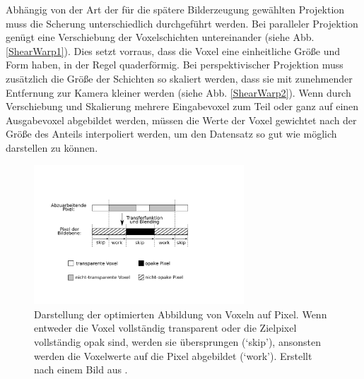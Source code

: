 \documentclass[a4paper,fontsize=12pt,toc=bib,halfparskip]{scrartcl}
\begin{document}
Abh\"angig von der Art der f\"ur die sp\"atere Bilderzeugung gew\"ahlten Projektion muss die Scherung unterschiedlich durchgef\"uhrt werden. Bei paralleler Projektion gen\"ugt eine Verschiebung der Voxelschichten untereinander (siehe Abb. \ref{ShearWarp1}). Dies setzt vorraus, dass die Voxel eine einheitliche Gr\"o{\ss}e und Form haben, in der Regel quaderf\"ormig. Bei perspektivischer Projektion muss zus\"atzlich die Gr\"o{\ss}e der Schichten so skaliert werden, dass sie mit zunehmender Entfernung zur Kamera kleiner werden (siehe Abb. \ref{ShearWarp2}). Wenn durch Verschiebung und Skalierung mehrere Eingabevoxel zum Teil oder ganz auf einen Ausgabevoxel abgebildet werden, m\"ussen die Werte der Voxel gewichtet nach der Gr\"o{\ss}e des Anteils interpoliert werden, um den Datensatz so gut wie m\"oglich darstellen zu k\"onnen.

\begin{figure}
	\centering
	\includegraphics[width=0.7\textwidth]{pictures/Scanline.png}
	\caption{Darstellung der optimierten Abbildung von Voxeln auf Pixel. Wenn entweder die Voxel vollst\"andig transparent oder die Zielpixel vollst\"andig opak sind, werden sie \"ubersprungen (`skip'), ansonsten werden die Voxelwerte auf die Pixel abgebildet (`work'). Erstellt nach einem Bild aus \cite{lacroute1994fast}.}
	\label{Scanline}
\end{figure}
\end{document}
